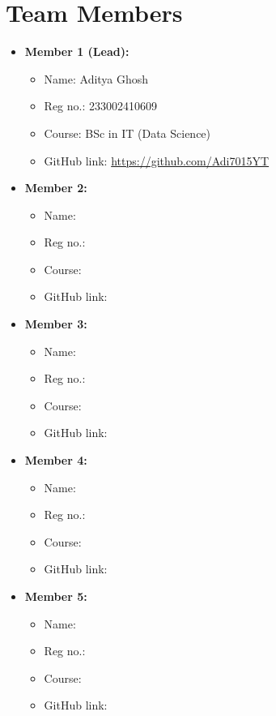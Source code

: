 \documentclass[a4paper,12pt]{article}
\begin{document}
\section*{Team Members}
\begin{itemize}
    \item \textbf{Member 1 (Lead):} 
    \begin{itemize}
        \item Name: Aditya Ghosh
        \item Reg no.: 233002410609
        \item Course: BSc in IT (Data Science)
        \item GitHub link: \url{https://github.com/Adi7015YT}
    \end{itemize}

    \item \textbf{Member 2:} 
    \begin{itemize}
        \item Name: 
        \item Reg no.: 
        \item Course: 
        \item GitHub link: \url{}
    \end{itemize}

    \item \textbf{Member 3:} 
    \begin{itemize}
        \item Name: 
        \item Reg no.: 
        \item Course: 
        \item GitHub link: \url{}
    \end{itemize}

    \item \textbf{Member 4:} 
    \begin{itemize}
        \item Name: 
        \item Reg no.: 
        \item Course: 
        \item GitHub link: \url{}
    \end{itemize}

    \item \textbf{Member 5:} 
    \begin{itemize}
        \item Name: 
        \item Reg no.: 
        \item Course: 
        \item GitHub link: \url{}
    \end{itemize}
\end{itemize}

\newpage %
\tableofcontents %

\newpage %
\end{document}
